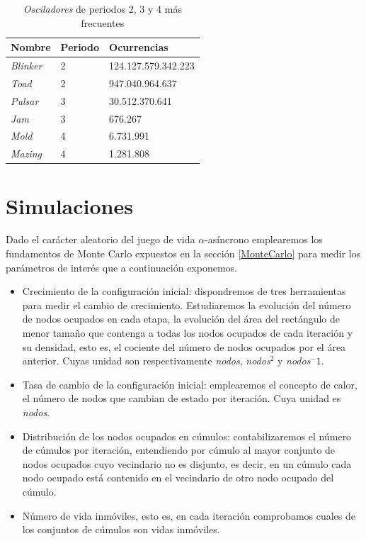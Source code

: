 \documentclass[../proyecto.tex]{memoir}
\begin{document}
\begin{table}
\centering
\begin{tabular}{|l|l|l|}
\hline
\textbf{Nombre}  & \textbf{Periodo} & \textbf{Ocurrencias} \\ \hline
\textit{Blinker} & 2                & 124.127.579.342.223  \\ \hline
\textit{Toad}    & 2                & 947.040.964.637      \\ \hline
\textit{Pulsar}  & 3                & 30.512.370.641       \\ \hline
\textit{Jam}     & 3                & 676.267              \\ \hline
\textit{Mold}    & 4                & 6.731.991            \\ \hline
\textit{Mazing}  & 4                & 1.281.808            \\ \hline
\end{tabular}
\caption{\textit{Osciladores} de periodos 2, 3 y 4 más frecuentes}
\label{tab:osciladores}
\end{table}

\section{Simulaciones} \label{vars}

Dado el carácter aleatorio del juego de vida $\alpha$-asíncrono emplearemos los fundamentos de Monte Carlo expuestos en la sección \ref{MonteCarlo} para medir los parámetros de interés que a continuación exponemos.

\begin{itemize}
\item Crecimiento de la configuración inicial: dispondremos de tres herramientas para medir el cambio de crecimiento. Estudiaremos la evolución del número de nodos ocupados en cada etapa, la evolución del área del rectángulo de menor tamaño que contenga a todas los nodos ocupados de cada iteración y su densidad, esto es, el cociente del número de nodos ocupados por el área anterior. Cuyas unidad son respectivamente \textit{nodos}, \textit{nodos}$^2$ y \textit{nodos}$^-1$.
\item Tasa de cambio de la configuración inicial: emplearemos el concepto de calor, el número de nodos que cambian de estado por iteración. Cuya unidad es \textit{nodos}.
\item Distribución de los nodos ocupados en cúmulos: contabilizaremos el número de cúmulos por iteración, entendiendo por cúmulo al mayor conjunto de nodos ocupados cuyo vecindario no es disjunto, es decir, en un cúmulo cada nodo ocupado está contenido en el vecindario de otro nodo ocupado del cúmulo.
\item Número de vida inmóviles, esto es, en cada iteración comprobamos cuales de los conjuntos de cúmulos son vidas inmóviles.
\end{itemize}
\end{document}
